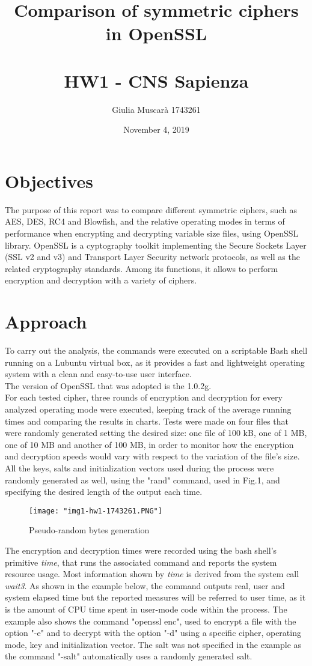 \documentclass{article}
\title{Comparison of symmetric ciphers in OpenSSL \\
	 \large \\ HW1 - CNS Sapienza}
\author{Giulia Muscarà 1743261}
\date{November 4, 2019}
\begin{document}
\maketitle

\section{Objectives}
The purpose of this report was to compare different symmetric ciphers, such as AES, DES, RC4 and Blowfish, and the relative operating modes in terms of performance when encrypting and decrypting variable size files, using OpenSSL library. OpenSSL is a cyptography toolkit implementing the Secure Sockets Layer (SSL v2 and v3) and Transport Layer Security network protocols, as well as the related cryptography standards. Among its functions, it allows to perform encryption and decryption with a variety of ciphers.

\section{Approach}
To carry out the analysis, the commands were executed on a scriptable Bash shell running on a Lubuntu virtual box, as it provides a fast and lightweight operating system with a clean and easy-to-use user interface.\\ The version of OpenSSL that was adopted is the 1.0.2g. \\ 
For each tested cipher, three rounds of encryption and decryption for every analyzed operating mode were executed, keeping track of the average running times and comparing the results in charts. Tests were made on four files that were randomly generated setting the desired size: one file of 100 kB, one of 1 MB, one of 10 MB and another of 100 MB, in order to monitor how the encryption and decryption speeds would vary with respect to the variation of the file's size. All the keys, salts and initialization vectors used during the process were randomly generated as well, using the "rand" command, used in Fig.1, and specifying the desired length of the output each time. \\

\begin{figure}
\texttt{[image: "img1-hw1-1743261.PNG"]}
\caption{Pseudo-random bytes generation}
\end{figure}

The encryption and decryption times were recorded using the bash shell's primitive \textit{time}, that runs the associated command and reports the system resource usage. Most information shown by \textit{time} is derived from the system call \textit{wait3}. As shown in the example below, the command outputs real, user and system elapsed time but the reported measures will be referred to user time, as it is the amount of CPU time spent in user-mode code within the process. The example also shows the command "openssl enc", used to encrypt a file with the option "-e" and to decrypt with the option "-d" using a specific cipher, operating mode, key and initialization vector. The salt was not specified in the example as the command "-salt" automatically uses a randomly generated salt.
\end{document}
